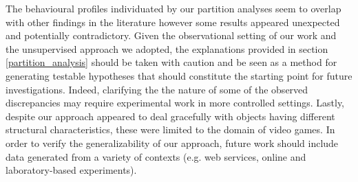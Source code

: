 The behavioural profiles individuated by our partition analyses seem to overlap with other findings in the literature however some results appeared unexpected and potentially contradictory. Given the observational setting of our work and the unsupervised approach we adopted, the explanations provided in section \ref{partition_analysis} should be taken with caution and be seen as a method for generating testable hypotheses that should constitute the starting point for future investigations. Indeed, clarifying the the nature of some of the observed discrepancies may require experimental work in more controlled settings. Lastly, despite our approach appeared to deal gracefully with objects having different structural characteristics, these were limited to the domain of video games. In order to verify the generalizability of our approach, future work should include data generated from a variety of contexts (e.g. web services, online and laboratory-based experiments).  